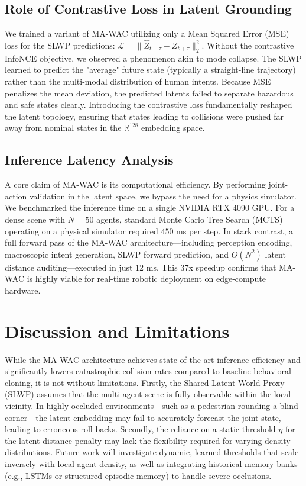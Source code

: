 \documentclass[conference]{IEEEtran}
\begin{document}
\subsection{Role of Contrastive Loss in Latent Grounding}
We trained a variant of MA-WAC utilizing only a Mean Squared Error (MSE) loss for the SLWP predictions: $\mathcal{L} = \lVert \hat{Z}_{t+\tau} - Z_{t+\tau} \rVert_2^2$. Without the contrastive InfoNCE objective, we observed a phenomenon akin to mode collapse. The SLWP learned to predict the "average" future state (typically a straight-line trajectory) rather than the multi-modal distribution of human intents. Because MSE penalizes the mean deviation, the predicted latents failed to separate hazardous and safe states clearly. Introducing the contrastive loss fundamentally reshaped the latent topology, ensuring that states leading to collisions were pushed far away from nominal states in the $\mathbb{R}^{128}$ embedding space.

\subsection{Inference Latency Analysis}
A core claim of MA-WAC is its computational efficiency. By performing joint-action validation in the latent space, we bypass the need for a physics simulator. We benchmarked the inference time on a single NVIDIA RTX 4090 GPU. For a dense scene with $N=50$ agents, standard Monte Carlo Tree Search (MCTS) operating on a physical simulator required $450$ ms per step. In stark contrast, a full forward pass of the MA-WAC architecture—including perception encoding, macroscopic intent generation, SLWP forward prediction, and $O(N^2)$ latent distance auditing—executed in just $12$ ms. This 37x speedup confirms that MA-WAC is highly viable for real-time robotic deployment on edge-compute hardware.
\section{Discussion and Limitations}\label{sec:discussion}
While the MA-WAC architecture achieves state-of-the-art inference efficiency and significantly lowers catastrophic collision rates compared to baseline behavioral cloning, it is not without limitations. 
Firstly, the Shared Latent World Proxy (SLWP) assumes that the multi-agent scene is fully observable within the local vicinity. In highly occluded environments—such as a pedestrian rounding a blind corner—the latent embedding may fail to accurately forecast the joint state, leading to erroneous roll-backs. 
Secondly, the reliance on a static threshold $\eta$ for the latent distance penalty may lack the flexibility required for varying density distributions. Future work will investigate dynamic, learned thresholds that scale inversely with local agent density, as well as integrating historical memory banks (e.g., LSTMs or structured episodic memory) to handle severe occlusions.
\end{document}
